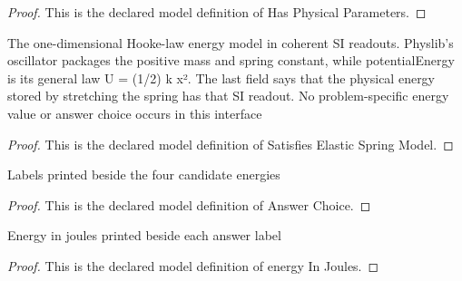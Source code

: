 \begin{proof}
  This is the declared model definition of Has Physical Parameters.
\end{proof}
\begin{definition}
  \label{def:physics:phyx-mini-0226:phyxminiproblems-problemphyxmini0226-satisfieselasticspringmodel}
  The one-dimensional Hooke-law energy model in coherent SI readouts. Physlib's oscillator packages the positive mass and spring constant, while potentialEnergy is its general law U = (1/2) k x². The last field says that the physical energy stored by stretching the spring has that SI readout. No problem-specific energy value or answer choice occurs in this interface
\end{definition}
\begin{proof}
  This is the declared model definition of Satisfies Elastic Spring Model.
\end{proof}
\begin{definition}
  \label{def:physics:phyx-mini-0226:phyxminiproblems-problemphyxmini0226-answerchoice}
  Labels printed beside the four candidate energies
\end{definition}
\begin{proof}
  This is the declared model definition of Answer Choice.
\end{proof}
\begin{definition}
  \label{def:physics:phyx-mini-0226:phyxminiproblems-problemphyxmini0226-answerchoice-energyinjoules}
  Energy in joules printed beside each answer label
\end{definition}
\begin{proof}
  This is the declared model definition of energy In Joules.
\end{proof}

